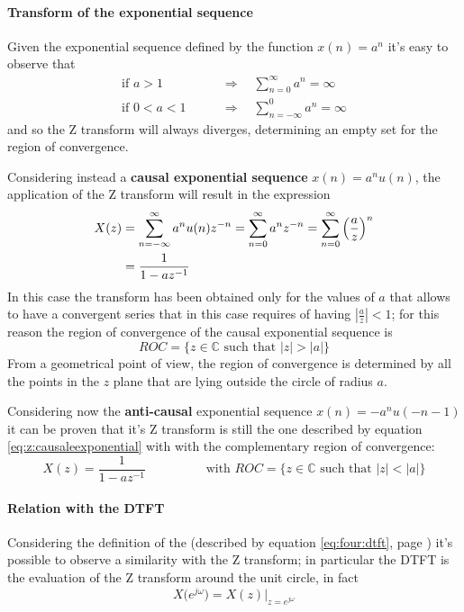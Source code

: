 	\paragraph{Transform of the exponential sequence} Given the exponential sequence defined by the function $x(n) = a^n$ it's easy to observe that
	\begin{align*}
		\textrm{if } a > 1 \qquad &\Rightarrow \quad \sum_{n=0}^\infty a^n = \infty  \\
		\textrm{if } 0 < a < 1 \qquad &\Rightarrow \quad \sum_{n=-\infty}^0 a^n = \infty
	\end{align*}
	and so the Z transform will always diverges, determining an empty set for the region of convergence.
	
	Considering instead a \textbf{causal exponential sequence} $x(n) = a^n u(n)$, the application of the Z transform will result in the expression
	\begin{equation} \label{eq:z:causaleexponential}
	\begin{aligned}
		X(z) & = \sum_{n=-\infty}^\infty a^nu(n) z^{-n} = \sum_{n=0}^\infty a^n z^{-n} = \sum_{n=0}^{\infty} \left( \frac a z\right)^n  \\
		& = \frac{1}{1-az^{-1}}
	\end{aligned}
	\end{equation}
	In this case the transform has been obtained only for the values of $a$ that allows to have a convergent series that in this case requires of having $\left|\frac az\right| < 1$; for this reason the region of convergence of the causal exponential sequence is
	\begin{equation}
		ROC = \big\{ z \in \mathds C \textrm{ such that } |z| > |a| \big\}
	\end{equation}
	From a geometrical point of view, the region of convergence is determined by all the points in the $z$ plane that are lying outside the circle of radius $a$.
	
	Considering now the \textbf{anti-causal} exponential sequence $x(n) = -a^n u(-n-1)$ it can be proven that it's Z transform is still the one described by equation \ref{eq:z:causaleexponential} with with the complementary region of convergence:
	\begin{equation}
		X(z) = \frac{1}{1-az^{-1}} \hspace{2cm} \textrm{with } ROC = \big\{ z \in \mathds C \textrm{ such that } |z| < |a| \big\}
	\end{equation}

	\paragraph{Relation with the DTFT} Considering the definition of the \dtft (described by equation \ref{eq:four:dtft}, page \pageref{eq:four:dtft}) it's possible to observe a similarity with the Z transform; in particular the DTFT is the evaluation of the Z transform around the unit circle, in fact
	\begin{equation}
		X\big(e^{j\omega}\big) = X(z) \Big|_{z=e^{j\omega}}
	\end{equation}
	
